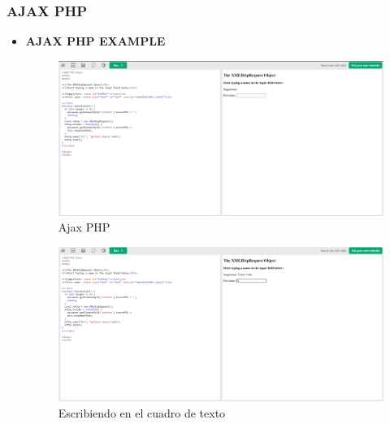 \documentclass{article}
\begin{document}
	\subsubsection{AJAX PHP}
	\begin{itemize}
		\item \textbf{AJAX PHP EXAMPLE}
		\begin{figure}[H]
			\centering
			\includegraphics[width=1\textwidth,keepaspectratio]{img/ejemplo15.png}
			\caption{Ajax PHP}
		\end{figure}
		\begin{figure}[H]
			\centering
			\includegraphics[width=1\textwidth,keepaspectratio]{img/boton15.png}
			\caption{Escribiendo en el cuadro de texto}
		\end{figure}
	\end{itemize}
	\newpage
\end{document}
